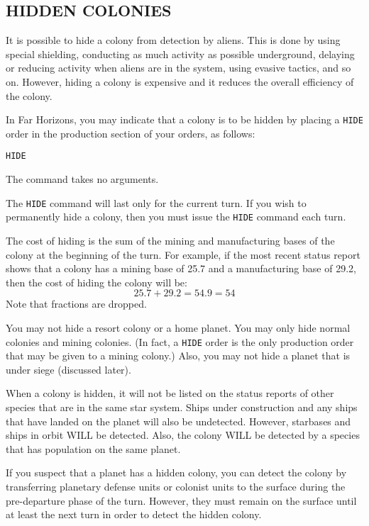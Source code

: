 \documentclass[10pt,titlepage]{article}
\begin{document}
\subsection{HIDDEN COLONIES}
\label{sec:hiddencolonies}


It is possible to hide a colony from detection by aliens.  This is done by
using special shielding, conducting as much activity as possible underground,
delaying or reducing activity when aliens are in the system, using evasive
tactics, and so on.  However, hiding a colony is expensive and it reduces the
overall efficiency of the colony.

In Far Horizons, you may indicate that a colony is to be hidden by placing a
\texttt{HIDE} order in the production section of your orders, as follows:

\begin{verbatim}
HIDE	\end{verbatim} 

The command takes no arguments.

The \texttt{HIDE} command will last only for the current turn.  If you wish to
permanently hide a colony, then you must issue the \texttt{HIDE} command each turn.

The cost of hiding is the sum of the mining and manufacturing bases of the
colony at the beginning of the turn.  For example, if the most recent status
report shows that a colony has a mining base of 25.7 and a manufacturing base
of 29.2, then the cost of hiding the colony will be:
\[
		25.7 + 29.2  =  54.9  =  54
\]
Note that fractions are dropped.

You may not hide a resort colony or a home planet.  You may only hide normal
colonies and mining colonies.  (In fact, a \texttt{HIDE} order is the only production
order that may be given to a mining colony.)  Also, you may not hide a planet
that is under siege (discussed later).

When a colony is hidden, it will not be listed on the status reports of other
species that are in the same star system.  Ships under construction and any
ships that have landed on the planet will also be undetected.  However,
starbases and ships in orbit WILL be detected.  Also, the colony WILL be
detected by a species that has population on the same planet.

If you suspect that a planet has a hidden colony, you can detect the colony by
transferring planetary defense units or colonist units to the surface during
the pre-departure phase of the turn.  However, they must remain on the surface
until at least the next turn in order to detect the hidden colony.
\end{document}
